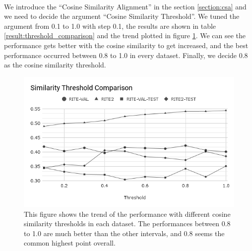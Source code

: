 \documentclass{article}
\begin{document}
\begin{CJK*}{UTF8}{bkai}
\paragraph{}
We introduce the ``Cosine Similarity Alignment'' in the section \ref{section:csa} and we need to decide the argument ``Cosine Similarity Threshold''. We tuned the argument from 0.1 to 1.0 with step 0.1, the results are shown in table \ref{result:threshold_comparison} and the trend plotted in figure \ref{fig:threshold}. We can see the performance gets better with the cosine similarity to get increased, and the best performance occurred between 0.8 to 1.0 in every dataset. Finally, we decide 0.8 as the cosine similarity threshold.

\begin{figure}
  \centering
  \includegraphics[width=15cm]{SimThresholdComp.png}
  \caption[Cosine Similarity Threshold Comparison]{This figure shows the trend of the performance with different cosine similarity thresholds in each dataset. The performances between 0.8 to 1.0 are much better than the other intervals, and 0.8 seems the common highest point overall.}
  \label{fig:threshold}
\end{figure}


\end{CJK*}
\end{document}
